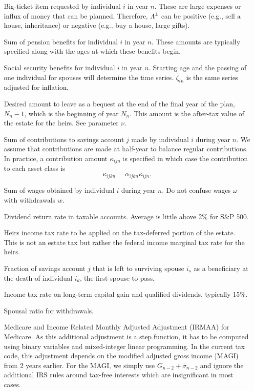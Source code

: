 \documentclass{report}[fleqn,12pt]
\begin{document}
\begin{description}[leftmargin=4em,style=multiline]
\item [$\Lambda^\pm_{in}$]
	Big-ticket item requested by individual $i$ in year $n$.
	These are large expenses or influx of money
	that can be planned. Therefore, $\Lambda^\pm$ can be positive
	(e.g., sell a house, inheritance) or negative (e.g., buy a house, large gifts).
\item [$\pi_{in}$]
	Sum of pension benefits for individual $i$ in year $n$. These amounts are typically
	specified along with the ages at which these benefits begin.
\item [$\zeta_{in}$]
	Social security benefits for individual $i$ in year $n$. Starting age and the passing
	of one individual for spouses will determine the time series. $\bar{\zeta}_{in}$ is
	the same series adjusted for inflation.
\item [$\epsilon_{N_n}$]
	Desired amount to leave as a bequest at the end of the final year of the plan, $N_n-1$,
	which is the beginning of year $N_n$. This amount is the after-tax value of the estate
	for the heirs. See parameter $\nu$.
\item [$\kappa_{ijn}$]
	Sum of contributions to savings account $j$ made by individual $i$ during year $n$.
	We assume that contributions are made at half-year to balance regular contributions.
	In practice, a contribution
	amount $\kappa_{ijn}$ is specified in which case the contribution to each asset
	class is
	\begin{equation}
		\kappa_{ijkn} = \alpha_{ijkn}\kappa_{ijn}.
	\end{equation}
\item [$\omega_{in}$]
	Sum of wages obtained by individual $i$ during year $n$.
	Do not confuse wages $\omega$ with withdrawals $w$.
\item [$\mu$]
	Dividend return rate in taxable accounts. Average is little above 2\% for S\&P 500.
\item [$\nu$]
	Heirs income tax rate to be applied on the tax-deferred portion of the estate. This is not an estate tax
	but rather the federal income marginal tax rate for the heirs.
\item [$\phi_j$]
	Fraction of savings account $j$ that is left to surviving spouse $i_s$ as a beneficiary
	at the death of individual $i_d$, the first spouse to pass.
\item [$\psi$]
	Income tax rate on long-term capital gain and qualified dividends, typically 15\%.
\item [$\eta$]
	Spousal ratio for withdrawals.
\item [$\mathcal{M}_n$]
	Medicare and Income Related Monthly Adjusted Adjustment (IRMAA)
	for Medicare. As this additional adjustment
	is a step function, it has to be computed using binary variables and mixed-integer linear
	programming. In the current tax code, this adjustment
	depends on the modified adjusted gross income (MAGI) from 2 years earlier. For the
	MAGI, we simply use $G_{n-2} + \bar{\sigma}_{n-2}$ and ignore the additional IRS
	rules around tax-free interests which are insignificant in most cases.


\end{description}
\end{document}
